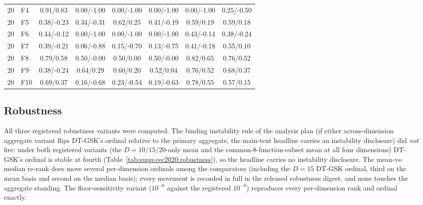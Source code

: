 \documentclass[algorithms,article,submit,moreauthors,pdftex]{Definitions/mdpi}
\newcommand{\dtgsk}{DT-GSK}
\begin{document}
\begin{table}[p]
{\begin{tabular}{clcccccc}
20 & F4 & 0.91/0.83 & 0.00/-1.00 & 0.00/-1.00 & 0.00/-1.00 & 0.00/-1.00 & 0.25/-0.50 \\
20 & F5 & 0.38/-0.23 & 0.34/-0.31 & 0.62/0.25 & 0.41/-0.19 & 0.59/0.19 & 0.59/0.18 \\
20 & F6 & 0.44/-0.12 & 0.00/-1.00 & 0.00/-1.00 & 0.00/-1.00 & 0.43/-0.14 & 0.38/-0.24 \\
20 & F7 & 0.39/-0.21 & 0.06/-0.88 & 0.15/-0.70 & 0.13/-0.75 & 0.41/-0.18 & 0.55/0.10 \\
20 & F8 & 0.79/0.58 & 0.50/-0.00 & 0.50/0.00 & 0.50/-0.00 & 0.82/0.65 & 0.76/0.52 \\
20 & F9 & 0.38/-0.24 & 0.64/0.29 & 0.60/0.20 & 0.52/0.04 & 0.76/0.52 & 0.68/0.37 \\
20 & F10 & 0.69/0.37 & 0.16/-0.68 & 0.23/-0.54 & 0.19/-0.63 & 0.78/0.55 & 0.57/0.15 \\
\bottomrule
\end{tabular}}
\end{table}

\clearpage
\subsection{Robustness}\label{sec:supp:cec2020:robustness}

All three registered robustness variants were computed.  The binding
instability rule of the analysis plan (if either across-dimension
aggregate variant flips \dtgsk{}'s ordinal relative to the primary
aggregate, the main-text headline carries an instability disclosure)
did \emph{not} fire: under both registered variants (the $D = 10/15/20$-only
mean and the common-8-function-subset mean at all four dimensions)
\dtgsk{}'s ordinal is stable at fourth
(Table~\ref{tab:supp:cec2020:robustness}), so the headline carries no
instability disclosure.  The mean-vs-median re-rank does move several
per-dimension ordinals among the comparators (including the $D = 15$
\dtgsk{} ordinal, third on the mean basis and second on the median
basis); every movement is recorded in full in the released robustness
digest, and none touches the aggregate standing.  The floor-sensitivity
variant ($10^{-6}$ against the registered $10^{-8}$) reproduces every
per-dimension rank and ordinal exactly.
\end{document}
